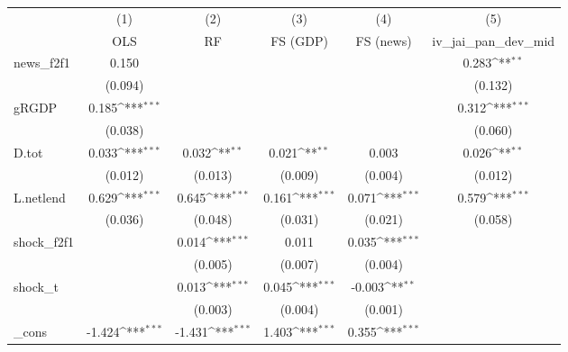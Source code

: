 {
\def\sym#1{\ifmmode^{#1}\else\(^{#1}\)\fi}
\begin{tabular}{l*{5}{c}}
\toprule
            &\multicolumn{1}{c}{(1)}&\multicolumn{1}{c}{(2)}&\multicolumn{1}{c}{(3)}&\multicolumn{1}{c}{(4)}&\multicolumn{1}{c}{(5)}\\
            &\multicolumn{1}{c}{OLS}&\multicolumn{1}{c}{RF}&\multicolumn{1}{c}{FS (GDP)}&\multicolumn{1}{c}{FS (news)}&\multicolumn{1}{c}{iv\_jai\_pan\_dev\_mid}\\
\midrule
news\_f2f1   &       0.150         &                     &                     &                     &       0.283\sym{**} \\
            &     (0.094)         &                     &                     &                     &     (0.132)         \\
\addlinespace
gRGDP       &       0.185\sym{***}&                     &                     &                     &       0.312\sym{***}\\
            &     (0.038)         &                     &                     &                     &     (0.060)         \\
\addlinespace
D.tot       &       0.033\sym{***}&       0.032\sym{**} &       0.021\sym{**} &       0.003         &       0.026\sym{**} \\
            &     (0.012)         &     (0.013)         &     (0.009)         &     (0.004)         &     (0.012)         \\
\addlinespace
L.netlend   &       0.629\sym{***}&       0.645\sym{***}&       0.161\sym{***}&       0.071\sym{***}&       0.579\sym{***}\\
            &     (0.036)         &     (0.048)         &     (0.031)         &     (0.021)         &     (0.058)         \\
\addlinespace
shock\_f2f1  &                     &       0.014\sym{***}&       0.011         &       0.035\sym{***}&                     \\
            &                     &     (0.005)         &     (0.007)         &     (0.004)         &                     \\
\addlinespace
shock\_t     &                     &       0.013\sym{***}&       0.045\sym{***}&      -0.003\sym{**} &                     \\
            &                     &     (0.003)         &     (0.004)         &     (0.001)         &                     \\
\addlinespace
\_cons      &      -1.424\sym{***}&      -1.431\sym{***}&       1.403\sym{***}&       0.355\sym{***}&                     \\

\end{tabular}}
